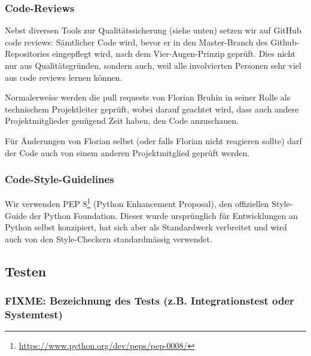 \documentclass[a4paper]{article}
\begin{document}
\subsubsection{Code-Reviews}
\label{sec:codereviews}

Nebst diversen Tools zur Qualitätssicherung (siehe unten) setzen wir auf GitHub
code reviews: Sämtlicher Code wird, bevor er in den Master-Branch des
Github-Repositories eingepflegt wird, nach dem Vier-Augen-Prinzip geprüft. Dies
nicht nur aus Qualitätsgründen, sondern auch, weil alle involvierten Personen
sehr viel aus code reviews lernen können.

Normalerweise werden die pull requests von Florian Bruhin in seiner Rolle als
technischem Projektleiter geprüft, wobei darauf geachtet wird, dass auch andere
Projektmitglieder genügend Zeit haben, den Code anzuschauen.

Für Änderungen von Florian selbst (oder falls Florian nicht reagieren sollte)
darf der Code auch von einem anderen Projektmitglied geprüft werden.

\subsubsection{Code-Style-Guidelines}
Wir verwenden PEP 8\footnote{\url{https://www.python.org/dev/peps/pep-0008/}}
(Python Enhancement Proposal), den offiziellen Style-Guide der Python
Foundation. Dieser wurde ursprünglich für Entwicklungen an Python selbst
konzipiert, hat sich aber als Standardwerk verbreitet und wird auch von den
Style-Checkern standardmässig verwendet.

\subsection{Testen}
\subsubsection {FIXME: Bezeichnung des Tests (z.B. Integrationstest oder Systemtest)}
\end{document}
